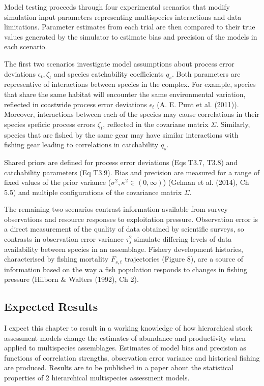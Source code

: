 \documentclass[12pt,]{scrartcl}
\begin{document}
Model testing proceeds through four experimental scenarios that modify
simulation input parameters representing multispecies interactions and
data limitations. Parameter estimates from each trial are then compared
to their true values generated by the simulator to estimate bias and
precision of the models in each scenario.

The first two scenarios investigate model assumptions about process
error deviations \(\epsilon_{t}, \zeta_t\) and species catchability
coefficients \(q_s\). Both parameters are representive of interactions
between species in the complex. For example, species that share the same
habitat will encounter the same environmental variation, reflected in
coastwide process error deviations \(\epsilon_t\) (A. E. Punt et al.
(2011)). Moreover, interactions between each of the species may cause
correlations in their species speficic process errors \(\zeta_t\),
reflected in the covariane matrix \(\Sigma\). Similarly, species that
are fished by the same gear may have similar interactions with fishing
gear leading to correlations in catchability \(q_s\).

Shared priors are defined for process error deviations (Eqs T3.7, T3.8)
and catchability parameters (Eq T3.9). Bias and precision are measured
for a range of fixed values of the prior variance
(\(\sigma^2, \kappa^2 \in (0,\infty)\)) (Gelman et al. (2014), Ch 5.5)
and multiple configurations of the covariance matrix \(\Sigma\).

The remaining two scenarios contrast information available from survey
observations and resource responses to exploitation pressure.
Observation error is a direct measurement of the quality of data
obtained by scientific surveys, so contrasts in observation error
variance \(\tau_s^2\) simulate differing levels of data availability
between species in an assemblage. Fishery development histories,
characterised by fishing mortality \(F_{s,t}\) trajectories (Figure 8),
are a source of information based on the way a fish population responds
to changes in fishing pressure (Hilborn \& Walters (1992), Ch 2).

\subsection{Expected Results}\label{expected-results}

I expect this chapter to result in a working knowledge of how
hierarchical stock assessment models change the estimates of abundance
and productivity when applied to multispecies assemblages. Estimates of
model bias and precision as functions of correlation strengths,
observation error variance and historical fishing are produced. Results
are to be published in a paper about the statistical properties of 2
hierarchical multispecies assessment models.
\end{document}
